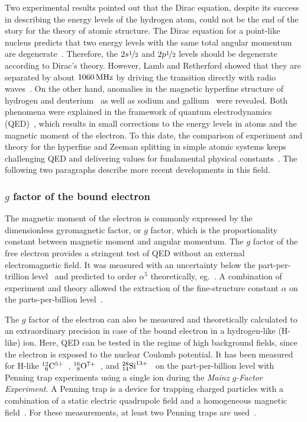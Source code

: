 Two experimental results pointed out that the Dirac equation, despite its success in describing the energy levels of the hydrogen atom, could not be the end of the story for the theory of atomic structure. 
The Dirac equation for a point-like nucleus predicts that two energy levels with the same total angular momentum are degenerate~\cite{greiner2000}. Therefore, the $2s\nicefrac{1}{2}$ and $2p\nicefrac{1}{2}$ levels should be degenerate according to Dirac's theory. However, Lamb and Retherford showed that they are separated by about $1060\,\rm{MHz}$ by driving the transition directly with radio waves~\cite{lamb1947}. On the other hand, anomalies in the magnetic hyperfine structure of hydrogen and deuterium~\cite{nafe1947} as well as sodium and gallium~\cite{kusch1947,kusch1948} were revealed. Both phenomena were explained in the framework of quantum electrodynamics (QED)~\cite{schwinger1948}, which results in small corrections to the energy levels in atoms and the magnetic moment of the electron. To this date, the comparison of experiment and theory for the hyperfine and Zeeman splitting in simple atomic systems keeps challenging QED and delivering values for fundamental physical constants~\cite{haensch1979}. The following two paragraphs describe more recent developments in this field.
\subsubsection*{$g$ factor of the bound electron}
The magnetic moment of the electron is commonly expressed by the dimensionless gyromagnetic factor, or $g$ factor, which is the proportionality constant between magnetic moment and angular momentum. The $g$ factor of the free electron provides a stringent test of QED without an external electromagnetic field. It was measured with an uncertainty below the part-per-trillion level~\cite{odom2006,hanneke2008} and predicted to order $\alpha^5$ theoretically, eg.~\cite{kinoshita2006,aoyama2007,aoyama2015,aoyama2017}. A combination of experiment and theory allowed the extraction of the fine-structure constant $\alpha$ on the parts-per-billion level~\cite{gabrielse2006,gabrielse2007}.

The $g$ factor of the electron can also be measured and theoretically calculated to an extraordinary precision in case of the bound electron in a hydrogen-like (H-like) ion. Here, QED can be tested in the regime of high background fields, since the electron is exposed to the nuclear Coulomb potential. It has been measured for H-like $^{12}_{\phantom{0}6}\rm{C}^{5+}$~\cite{Haffner2000,Sturm2014}, $^{16}_{\phantom{0}8}\rm{O}^{7+}$~\cite{Verdu2004}, and $^{28}_{14}\rm{Si}^{13+}$~\cite{Sturm2011} on the part-per-billion level with Penning trap experiments using a single ion during the \textit{Mainz $g$-Factor Experiment}. A Penning trap is a device for trapping charged particles with a combination of a static electric quadrupole field and a homogeneous magnetic field~\cite{geoniumtheory}. For these measurements, at least two Penning traps are used~\cite{annphysgfactor}.

